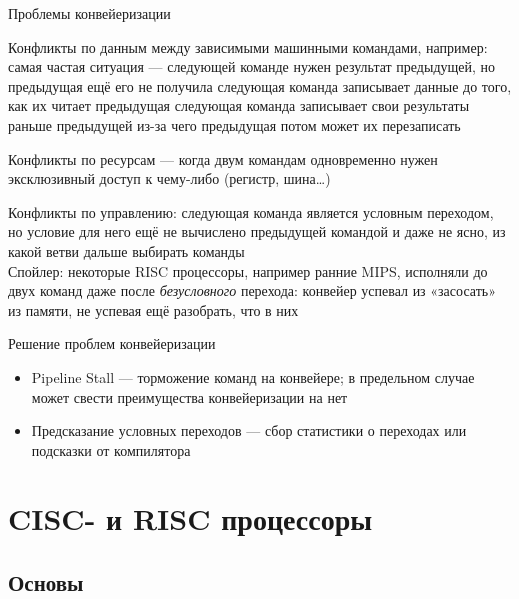\documentclass[xetex,aspectratio=43]{beamer}
\begin{document}
\begin{frame}{Проблемы конвейеризации}
    \begin{outline}[enumerate]
        \renewcommand{\outlineii}{itemize}
        \1 Конфликты по данным между зависимыми машинными командами, например:
            \2 самая частая ситуация — следующей команде нужен результат предыдущей, но предыдущая ещё его не получила
            \2 следующая команда записывает данные до того, как их читает предыдущая
            \2 следующая команда записывает свои результаты раньше предыдущей из-за чего предыдущая потом может их перезаписать

        \1 Конфликты по ресурсам — когда двум командам одновременно нужен эксклюзивный доступ к чему-либо (регистр, шина\ldots)

        \1 Конфликты по управлению: следующая команда является условным переходом, но условие для него ещё не вычислено предыдущей командой
            \2 и даже не ясно, из какой ветви дальше выбирать команды
            \pause\\
            \alert{Спойлер: некоторые RISC процессоры, например ранние MIPS, исполняли до двух команд даже после \emph{безусловного} перехода: конвейер успевал из «засосать» из памяти, не успевая ещё разобрать, что в них}
    \end{outline}
\end{frame}

\begin{frame}{Решение проблем конвейеризации}
    \begin{itemize}
        \item Pipeline Stall — торможение команд на конвейере; в предельном случае может свести преимущества конвейеризации на нет
        \item Предсказание условных переходов — сбор статистики о переходах или подсказки от компилятора
    \end{itemize}
\end{frame}

\section{CISC- и RISC процессоры}

\subsection{Основы}
\end{document}
